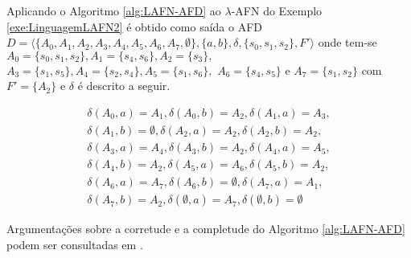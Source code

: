 \begin{example}
	Aplicando o Algoritmo \ref{alg:LAFN-AFD} ao $\lambda$-AFN do Exemplo \ref{exe:LinguagemLAFN2} é obtido como saída o AFD $D = \langle \{A_0, A_1, A_2, A_3, A_4, A_5, A_6, A_7, \emptyset\}, \{a,b\}, \delta, \{s_0, s_1, s_2\}, F' \rangle$ onde tem-se $A_0 = \{s_0, s_1, s_2\}, A_1 = \{s_4, s_6\}, A_2 = \{s_3\},$ $A_3 = \{s_1, s_5\}, A_4 = \{s_2, s_4\}, A_5 = \{s_1, s_6\},$ $A_6 = \{s_4, s_5\}$ e $A_7 = \{s_1, s_2\}$ com $F' = \{A_2\}$ e $\delta$ é descrito a seguir. 
	
	\begin{eqnarray*}
		\delta(A_0, a) = A_1, \delta(A_0, b) = A_2, \delta(A_1, a) = A_3,\\
		\delta(A_1, b) = \emptyset, \delta(A_2, a) = A_2, \delta(A_2, b) = A_2,\\
		\delta(A_3, a) = A_4, \delta(A_3, b) = A_2, \delta(A_4, a) = A_5, \\
		\delta(A_4, b) = A_2, \delta(A_5, a) = A_6, \delta(A_5, b) = A_2,\\
		\delta(A_6, a) = A_7, \delta(A_6, b) = \emptyset, \delta(A_7, a) = A_1,\\ 
		\delta(A_7, b) = A_2, \delta(\emptyset, a) = A_7, \delta(\emptyset, b) = \emptyset
	\end{eqnarray*}
\end{example}

\begin{remark}
	Argumentações sobre a corretude e a completude do Algoritmo \ref{alg:LAFN-AFD} podem ser consultadas em \cite{hopcroft2008}.
\end{remark}

\newpage

